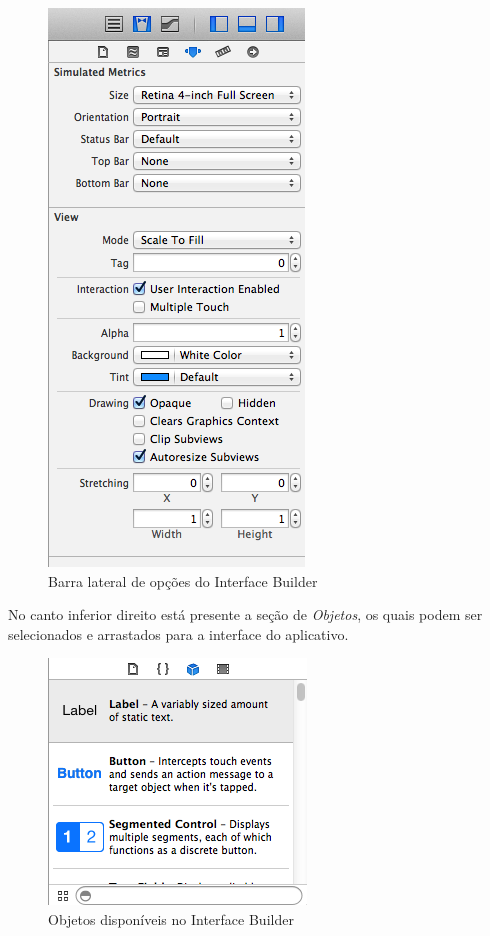 \documentclass[a4paper,12pt,brazil,doubleside]{book}
\begin{document}
\begin{singlespace}
\begin{figure}[H]
  \centering
  \includegraphics[scale=0.5]{figuras/3/tela_novo_projeto_11.png}
  \caption{Barra lateral de opções do Interface Builder}
  \label{fig:a}
\end{figure}


No canto inferior direito está presente a seção de \emph{Objetos}, os quais podem ser selecionados e arrastados para a interface do aplicativo.

\begin{figure}[H]
  \centering
  \includegraphics[scale=0.5]{figuras/3/tela_novo_projeto_12.png}
  \caption{Objetos disponíveis no Interface Builder}
  \label{fig:a}
\end{figure}


\end{singlespace}
\end{document}

